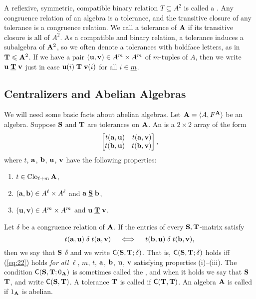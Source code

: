 A reflexive, symmetric, compatible binary relation $T\subseteq A^2$ is called a 
.  
Any congruence relation of an algebra is a tolerance, and the 
transitive closure of any tolerance is a congruence relation.
We call a tolerance of $\mathbf{A}$  if its transitive closure is all of $A^2$.
As a compatible and binary relation, 
a tolerance induces a subalgebra of $\mathbf{A}^2$, so we often denote a
tolerances with boldface letters, as in $\mathbf{T} \leqslant \mathbf{A}^2$.  If we have a pair 
$(\mathbf{u}, \mathbf{v}) \in A^m\times A^m$ of $m$-tuples of $A$, then we write  
$\mathbf{u} \mathrel{\underline{\mathbf{T}}} \mathbf{v}$ just in case $\mathbf{u}(i) \mathrel{\mathbf{T}} \mathbf{v}(i)$ for all $i\in \underline{m}$. 

\subsection{Centralizers and Abelian Algebras}
We will need some basic facts about abelian algebras. Let $\mathbf{A} = \langle A, F^{\mathbf{A}}\rangle$ be an algebra.
Suppose $\mathbf{S}$ and $\mathbf{T}$ are tolerances on $\mathbf{A}$.  An  
is a $2\times 2$ array of the form
\[
\begin{bmatrix*}[r] t(\ba,\bu) & t(\ba,\bv)\\ t(\bb,\bu)&t(\bb,\bv)\end{bmatrix*},
\]
where $t$, $\mathbf{a}$, $\mathbf{b}$, $\mathbf{u}$, $\mathbf{v}$ have the following properties:
\begin{enumerate}[\rm(i)]
\item $t\in \operatorname{Clo}_{\ell + m}\mathbf{A}$,
\item $(\mathbf{a}, \mathbf{b})\in A^\ell\times A^\ell$ and $\mathbf{a} \mathrel{\underline{\mathbf{S}}} \mathbf{b}$,
\item $(\mathbf{u}, \mathbf{v})\in A^m\times A^m$ and $\mathbf{u} \mathrel{\underline{\mathbf{T}}} \mathbf{v}$.
\end{enumerate}
Let $\delta$ be a congruence relation of $\mathbf{A}$.
If the entries of every $\mathbf{S},\mathbf{T}$-matrix satisfy
\begin{equation}
  \label{eq:22}
t(\mathbf{a},\mathbf{u}) \mathrel{\delta} t(\mathbf{a},\mathbf{v})\quad \iff \quad t(\mathbf{b},\mathbf{u}) \mathrel{\delta} t(\mathbf{b},\mathbf{v}),
\end{equation}
then we say that $\mathbf{S}$  $\delta$ and we write 
$\mathsf{C}(\mathbf{S}, \mathbf{T}; \delta)$.
That is, $\mathsf{C}(\mathbf{S}, \mathbf{T}; \delta)$ holds iff 
(\ref{eq:22}) holds \emph{for all}
$\ell$, $m$, $t$, $\mathbf{a}$, $\mathbf{b}$, $\mathbf{u}$, $\mathbf{v}$ satisfying properties (i)--(iii).
The condition $\mathsf{C}(\mathbf{S}, \mathbf{T}; 0_{\mathbf{A}})$ is sometimes called the 
, and when it holds we say  that
$\mathbf{S}$  $\mathbf{T}$, and write
$\mathsf{C}(\mathbf{S}, \mathbf{T})$.
A tolerance $\mathbf{T}$ is called  if $\mathsf{C}(\mathbf{T}, \mathbf{T})$.
An algebra $\mathbf{A}$ is called  if $1_{\mathbf{A}}$ is abelian.

